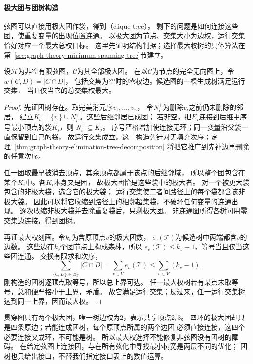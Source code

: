\paragraph{极大团与团树构造}
\label{sec:graph-theory-clique-trees}

弦图可以直接用极大团作袋，得到（clique tree）。
剩下的问题是如何连接这些团，使重复变量的出现位置连通。
以极大团为节点、交集大小为边权，运行交集恰好对应一个最大总权目标。
这里先证明结构判据；选择最大权树的具体算法在
第~\ref{sec:graph-theory-minimum-spanning-tree}节建立。

\begin{theorem}[最大权生成树与团树]
  \label{thm:graph-theory-clique-tree-maximum-weight}
  设\(\mathcal H\)为非空有限弦图，\(\mathcal C\)为其全部极大团。
  在以\(\mathcal C\)为节点的完全无向图上，令\(w(C,D)=|C\cap D|\)，
  包括交集为空时的零权边。候选图的一棵生成树满足运行交集，
  当且仅当它的总交集权最大。
\end{theorem}

\begin{proof}
先证团树存在。取完美消元序\(v_1,\ldots,v_n\)，
令\(N_i^+\)为删除\(v_i\)之前仍未删除的邻居，
建立\(K_i=\{v_i\}\cup N_i^+\)。这些后继邻居已成团；
若非空，把\(K_i\)连接到后继中序号最小顶点的袋\(K_j\)，则
\(N_i^+\subseteq K_j\)。
序号严格增加使连接无环；同一变量沿父袋一直保留到自己的袋，
故运行交集成立。这一构造先针对无填充次序；定理~\ref{thm:graph-theory-elimination-tree-decomposition}
将把它推广到先补边再删除的任意次序。

任一团取最早被消去顶点，其余顶点都属于该点的后继邻域，
所以整个团包含在某个\(K_i\)中。各\(K_i\)本身又是团，
故极大团恰是这些袋中的极大者。
对一个被更大袋包含的非极大袋，选含它的极大袋；
运行交集使二者间路径上的每个袋都含该非极大袋。
因此可以将它收缩到路径上的相邻超集袋，不破坏任何变量的连通出现。
逐次收缩非极大袋并去除重复袋后，只剩极大团。
非连通图所得各树可用零交集边连接，得到团树。

再证最大权刻画。令\(k_v\)为含原顶点\(v\)的极大团数，
\(e_v(\mathcal T)\)为候选树中两端都含\(v\)的边数。
这些边在\(k_v\)个团节点上构成森林，所以
\(e_v(\mathcal T)\leq k_v-1\)，等号当且仅当这些团连通。
交换有限求和次序，
\[
  \sum_{\{C,D\}\in E_{\mathcal T}}|C\cap D|
  =\sum_{v\in V}e_v(\mathcal T)
  \leq\sum_{v\in V}(k_v-1).
\]
刚构造的团树逐顶点取等号，所以总上界可达。
任一最大权树若有某点未取等号，总和便严格小于上界，矛盾。
故它满足运行交集；反过来，任一运行交集树达到同一上界，因而最大权。
\end{proof}

贯穿图只有两个极大团，唯一树边权为\(2\)，表示共享顶点\(2,3\)。
四环的极大团却只是四条原边；若能连成团树，每个原顶点所属的两个边团
必须直接连接，这四个必要连接又成环，不可能是树。
所以最大权选择不能修复非弦图没有团树的障碍。
在给定弦图上连接团，与在所有弦化中寻找最小树宽是两层不同的优化；
团树也只给出接口，不替我们指定接口表上的数值运算。

